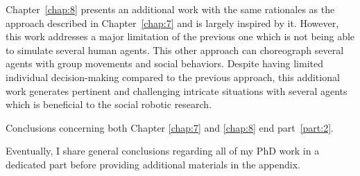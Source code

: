 Chapter~\ref{chap:8} presents an additional work with the same rationales as the approach described in Chapter~\ref{chap:7} and is largely inspired by it. However, this work addresses a major limitation of the previous one which is not being able to simulate several human agents. This other approach can choreograph several agents with group movements and social behaviors. Despite having limited individual decision-making compared to the previous approach, this additional work generates pertinent and challenging intricate situations with several agents which is beneficial to the social robotic research.

Conclusions concerning both Chapter \ref{chap:7} and \ref{chap:8} end part~\ref{part:2}.

Eventually, I share general conclusions regarding all of my PhD work in a dedicated part before providing additional materials in the appendix.  


